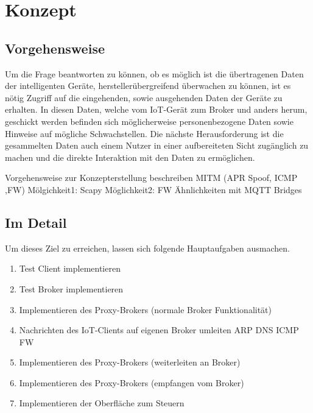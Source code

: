 \chapter{Konzept}
\section{Vorgehensweise}
    Um die Frage beantworten zu können, ob es möglich ist die übertragenen Daten der intelligenten Geräte, herstellerübergreifend überwachen zu können, ist es nötig Zugriff auf die eingehenden, sowie ausgehenden Daten der Geräte zu erhalten. In diesen Daten, welche vom IoT-Gerät zum Broker und anders herum, geschickt werden befinden sich möglicherweise personenbezogene Daten sowie Hinweise auf mögliche Schwachstellen.
    Die nächste Herausforderung ist die gesammelten Daten auch einem Nutzer in einer aufbereiteten Sicht zugänglich zu machen und die direkte Interaktion mit den Daten zu ermöglichen.
    
    
    
    Vorgehensweise zur Konzepterstellung beschreiben
    MITM (APR Spoof, ICMP ,FW)
    Mölgichkeit1: Scapy
    Möglichkeit2: FW
    Ähnlichkeiten mit MQTT Bridges

\section{Im Detail}

    Um dieses Ziel zu erreichen, lassen sich folgende Hauptaufgaben ausmachen.
    \begin{enumerate}
        \item Test Client implementieren
        \item Test Broker implementieren
        \item Implementieren des Proxy-Brokers (normale Broker Funktionalität)
        \item Nachrichten des IoT-Clients auf eigenen Broker umleiten
            ARP
            DNS
            ICMP
            FW
        \item Implementieren des Proxy-Brokers (weiterleiten an Broker)
        \item Implementieren des Proxy-Brokers (empfangen vom Broker)
        \item Implementieren der Oberfläche zum Steuern
    \end{enumerate}